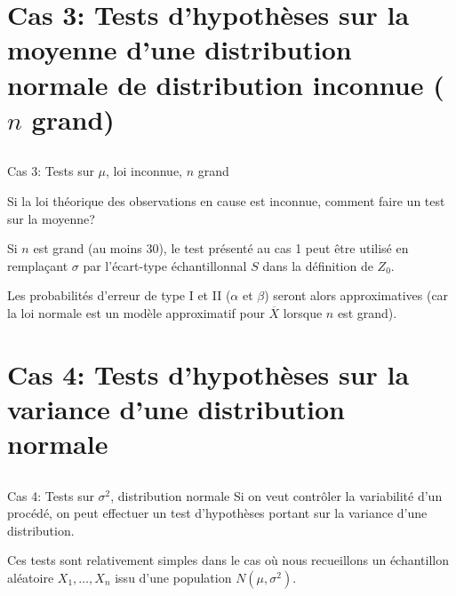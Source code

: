 \documentclass{BeamerTemplate}
\begin{document}
\section[3)Test $\mu$ (loi inconnue)]{Cas 3: Tests d'hypothèses sur la moyenne d'une distribution normale de distribution inconnue ($n$ grand)}
\subsection*{ }

\begin{frame}[t]{Cas 3: Tests sur $\mu$,  loi inconnue, $n$ grand}

Si la loi théorique des observations en cause est inconnue, comment faire un test sur la moyenne?

\vspace{5mm}

Si $n$ est grand (au moins 30), le test présenté au cas 1 peut être utilisé en rempla\c{c}ant $\sigma$ par l'écart-type échantillonnal $S$ dans la définition de $Z_0$.

\vspace{5mm}

Les probabilités d'erreur de type I et II ($\alpha$ et $\beta$) seront alors approximatives (car la loi normale est un modèle approximatif pour $\overline X$ lorsque $n$ est grand).

\end{frame}


\section[4)Test $\sigma^2$]{Cas 4: Tests d'hypothèses sur la variance d'une distribution normale}
\subsection*{ }


\begin{frame}[t]{Cas 4: Tests sur $\sigma^2$, distribution normale}
Si on veut contr\^oler la variabilité d'un procédé,
on peut effectuer un test d'hypothèses portant sur la variance d'une distribution.

\medskip
Ces tests sont relativement simples dans le cas o\`u nous
recueillons un \alert{échantillon aléatoire $X_1,\ldots,X_n$ issu d'une population
$N(\mu,\sigma^2)$}.
\end{frame}
\end{document}
